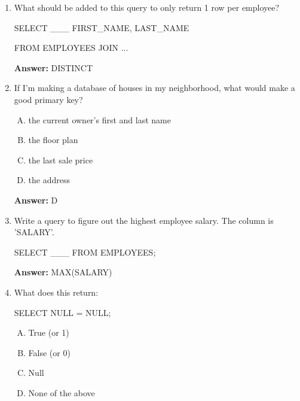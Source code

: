 \documentclass[12pt]{article}
\begin{document}
\begin{enumerate}[1.]
    \item

    What should be added to this query to only return 1 row per employee?

    \bigskip

    SELECT \_\_\_  FIRST\_NAME, LAST\_NAME

    FROM EMPLOYEES JOIN ...

    \bigskip

    \textbf{Answer:} DISTINCT

    \item

    If I'm making a database of houses in my neighborhood, what would make a good
    primary key?

    \bigskip

    \begin{enumerate}[A.]
        \item the current owner's first and last name
        \item the floor plan
        \item the last sale price
        \item the address
    \end{enumerate}

    \bigskip

    \textbf{Answer:} D

    \item

    Write a query to figure out the highest employee salary. The column is 'SALARY'.

    SELECT \_\_\_ FROM EMPLOYEES;

    \bigskip

    \textbf{Answer:} MAX(SALARY)

    \item

    What does this return:

    \bigskip

    SELECT NULL = NULL;

    \bigskip

    \begin{enumerate}[A.]
        \item True (or 1)
        \item False (or 0)
        \item Null
        \item None of the above

    \end{enumerate}


\end{enumerate}
\end{document}
